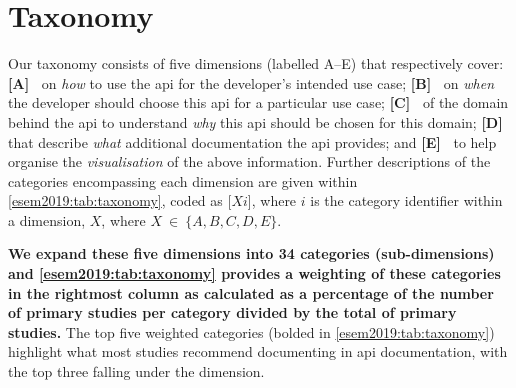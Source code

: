 %
%



\section{Taxonomy}
\label{esem2019:sec:findings}

Our taxonomy consists of five dimensions (labelled A--E) that respectively cover:
\textbf{[A]~\dima{}} on \textit{how} to use the \gls{api} for the developer's intended use case;
\textbf{[B]~\dimb{}} on \textit{when} the developer should choose this \gls{api} for a particular use case;
\textbf{[C]~\dimc{}} of the domain behind the \gls{api} to understand \textit{why} this \gls{api} should be chosen for this domain;
\textbf{[D]~\dimd{}} that describe \textit{what} additional documentation the \gls{api} provides; and
 \textbf{[E]~\dime{}} to help organise the \textit{visualisation} of the above information.
Further descriptions of the categories encompassing each dimension are given within \cref{esem2019:tab:taxonomy}, coded as [$Xi$], where $i$ is the category identifier within a dimension, $X$, where $X~\in~\{ A, B, C, D, E \}$.

\textbf{We expand these five dimensions into 34 categories (sub-dimensions) and \cref{esem2019:tab:taxonomy} provides a weighting of these categories in the rightmost column as calculated as a percentage of the number of primary studies per category divided by the total of primary studies.} The top five weighted categories (bolded in \cref{esem2019:tab:taxonomy}) highlight what most studies recommend documenting in \gls{api} documentation, with the top three falling under the \dima{} dimension.

